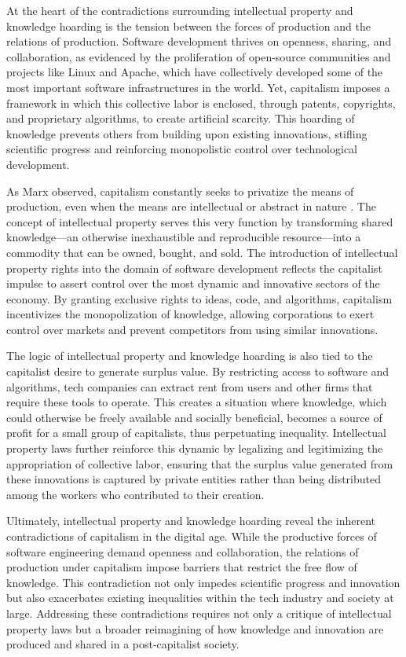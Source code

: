 At the heart of the contradictions surrounding intellectual property and knowledge hoarding is the tension between the forces of production and the relations of production. Software development thrives on openness, sharing, and collaboration, as evidenced by the proliferation of open-source communities and projects like Linux and Apache, which have collectively developed some of the most important software infrastructures in the world. Yet, capitalism imposes a framework in which this collective labor is enclosed, through patents, copyrights, and proprietary algorithms, to create artificial scarcity. This hoarding of knowledge prevents others from building upon existing innovations, stifling scientific progress and reinforcing monopolistic control over technological development.

As Marx observed, capitalism constantly seeks to privatize the means of production, even when the means are intellectual or abstract in nature \cite[pp.~527-529]{marx1867}. The concept of intellectual property serves this very function by transforming shared knowledge—an otherwise inexhaustible and reproducible resource—into a commodity that can be owned, bought, and sold. The introduction of intellectual property rights into the domain of software development reflects the capitalist impulse to assert control over the most dynamic and innovative sectors of the economy. By granting exclusive rights to ideas, code, and algorithms, capitalism incentivizes the monopolization of knowledge, allowing corporations to exert control over markets and prevent competitors from using similar innovations.

The logic of intellectual property and knowledge hoarding is also tied to the capitalist desire to generate surplus value. By restricting access to software and algorithms, tech companies can extract rent from users and other firms that require these tools to operate. This creates a situation where knowledge, which could otherwise be freely available and socially beneficial, becomes a source of profit for a small group of capitalists, thus perpetuating inequality. Intellectual property laws further reinforce this dynamic by legalizing and legitimizing the appropriation of collective labor, ensuring that the surplus value generated from these innovations is captured by private entities rather than being distributed among the workers who contributed to their creation.

Ultimately, intellectual property and knowledge hoarding reveal the inherent contradictions of capitalism in the digital age. While the productive forces of software engineering demand openness and collaboration, the relations of production under capitalism impose barriers that restrict the free flow of knowledge. This contradiction not only impedes scientific progress and innovation but also exacerbates existing inequalities within the tech industry and society at large. Addressing these contradictions requires not only a critique of intellectual property laws but a broader reimagining of how knowledge and innovation are produced and shared in a post-capitalist society.

